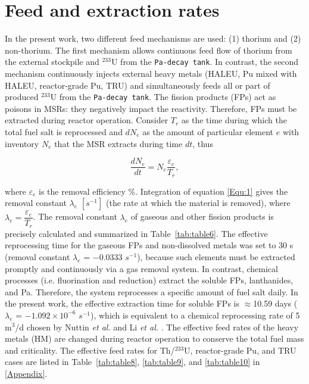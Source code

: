 \section{Feed and extraction rates} \label{Feed-and-extraction-rates}
In the present work, two different feed mechanisms are used: (1) thorium and (2) non-thorium.
The first mechanism allows continuous feed flow of thorium from the external stockpile and 
$^{233}$U from the \texttt{Pa-decay tank}. In contrast, the second mechanism 
continuously injects external heavy metals (\gls{HALEU}, Pu mixed with \gls{HALEU}, reactor-grade Pu, \gls{TRU}) and simultaneously feeds  
all or part of produced $^{233}$U from the \texttt{Pa-decay tank}. The fission 
products (FPs) act as poisons in MSRs: they negatively impact the reactivity. 
Therefore, \gls{FPs} must be extracted during reactor operation. Consider 
$T_{r}$ as the time during which the total fuel salt is reprocessed and 
$dN_{e}$ as the amount of particular element $e$ with inventory $N_{e}$ that 
the \gls{MSR} extracts during time $dt$, thus \cite{nuttin2005potential}

\begin{equation}
\label{Equ:1}
\dfrac{dN_{e}}{dt} = N_{e}\dfrac{\varepsilon_{e}}{T_{r}},	
\end{equation}

where $\varepsilon_{e}$ is the removal efficiency \%. Integration of equation \ref{Equ:1} gives 
the removal constant $\lambda_{e}$ $[s^{-1}]$ (the rate at which the material 
is removed), where $\lambda_{e}=\dfrac{{\varepsilon_{e}}}{{T}_{r}}$. The removal constant 
$\lambda_{e}$ of gaseous and other fission products is precisely calculated 
and summarized in Table~\ref{tab:table6}. The effective reprocessing time for 
the gaseous \gls{FPs} and non-dissolved metals was set to 30 s (removal 
constant $\lambda_{e}$ = $-0.0333$ $s^{-1}$), because such elements must be 
extracted promptly and continuously via a gas removal system. In contrast, 
chemical processes (i.e. fluorination and reduction) extract the soluble \gls{FPs}, lanthanides, and Pa.
Therefore, the system reprocesses a specific amount of fuel salt daily. In the 
present work, the effective extraction time for soluble \gls{FPs} is 
$\approx$10.59 days ($\lambda_{e}$ = $-1.092\times10^{-6}$ $s^{-1}$), which is 
equivalent to a chemical reprocessing rate of 5 m$^3$/d chosen by Nuttin \emph{et al.} \cite{nuttin2005potential} and Li \emph{et al.} \cite{li_optimization_2018}. The effective feed rates of 
the heavy metals (HM) are changed during reactor operation to conserve the 
total fuel mass and criticality. The effective feed rates for Th/$^{233}$U, reactor-grade Pu, and TRU cases are listed in Table~\ref{tab:table8}, \ref{tab:table9}, and \ref{tab:table10} in \ref{Appendix}.


